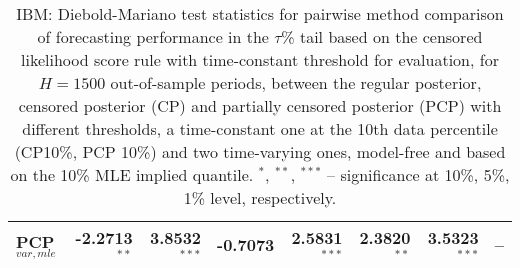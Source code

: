 {{\begin{table}
\begin{tabular}{l | rrrrrrr}
PCP$_{var,mle}$ & -2.2713$^{**}$\phantom{$^{*}$} & 3.8532$^{***}$ & -0.7073\phantom{$^{***}$} & 2.5831$^{***}$ & 2.3820$^{**}$\phantom{$^{*}$} & 3.5323$^{***}$ &    --\phantom{$^{***}$}   \\ 
\hline 
\end{tabular}
\caption{IBM: Diebold-Mariano test statistics for pairwise method comparison  of forecasting performance in the $\tau$\% tail based on  the censored likelihood score rule with time-constant threshold for evaluation, for $H=1500$ out-of-sample periods,  between  the regular posterior, censored posterior (CP) and  partially censored posterior (PCP) with different thresholds,  a time-constant one at the 10th data percentile (CP10\%, PCP 10\%) and two time-varying ones, model-free and based on the 10\% MLE implied quantile.
$^{*}$, $^{**}$, $^{***}$ -- significance at 10\%, 5\%, 1\% level, respectively.}
\label{tab:IBM_DM}  
\end{table}
}}